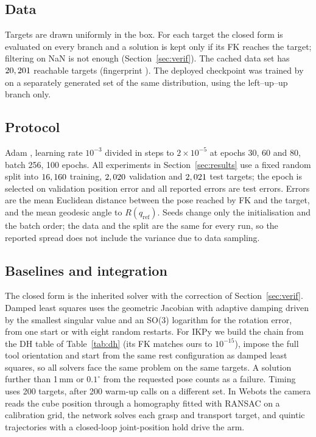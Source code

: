 \documentclass[11pt]{article}
\newcommand{\repo}[1]{\texttt{\detokenize{#1}}}
\begin{document}
\subsection{Data}
Targets are drawn uniformly in the box. For each target the closed form is
evaluated on every branch and a solution is kept only if its FK reaches the
target; filtering on NaN is not enough (Section~\ref{sec:verif}). The cached
data set has $20,201$ reachable targets (fingerprint \texttt{\fingerprint}).
The deployed checkpoint was trained by \repo{train_true_pinn.py} on a
separately generated set of the same distribution, using the
left--up--up branch only.

\subsection{Protocol}
Adam \citep{kingma2015adam}, learning rate $10^{-3}$ divided in steps to
$2\times10^{-5}$ at epochs 30, 60 and 80, batch 256, 100 epochs. All
experiments in Section~\ref{sec:results} use a fixed random split into
$16,160$ training, $2,020$ validation and $2,021$ test targets;
the epoch is selected on validation position error and all reported errors
are test errors. Errors are the mean Euclidean distance between the pose
reached by FK and the target, and the mean geodesic angle to $R(q_{\mathrm{ref}})$.
Seeds change only the initialisation and the batch order; the data and the
split are the same for every run, so the reported spread does not include
the variance due to data sampling.

\subsection{Baselines and integration}
The closed form is the inherited solver with the correction of
Section~\ref{sec:verif}. Damped least squares uses the geometric Jacobian with
adaptive damping driven by the smallest singular value and an SO(3) logarithm
for the rotation error, from one start or with eight random restarts. For
IKPy \citep{manceron_ikpy} we build the chain from the DH table of
Table~\ref{tab:dh} (its FK matches ours to $10^{-15}$), impose the full tool
orientation and start from the same rest configuration as damped least
squares, so all solvers face the same problem on the same targets. A solution
further than 1\,mm or $0.1^\circ$ from the requested pose counts as a failure.
Timing uses 200 targets, after 200 warm-up calls on a different set. In Webots the camera reads the cube position through a homography
fitted with RANSAC \citep{fischler1981ransac,hartley2004mvg} on a calibration
grid, the network solves each grasp and transport target, and quintic
trajectories with a closed-loop joint-position hold drive the arm.
\end{document}

